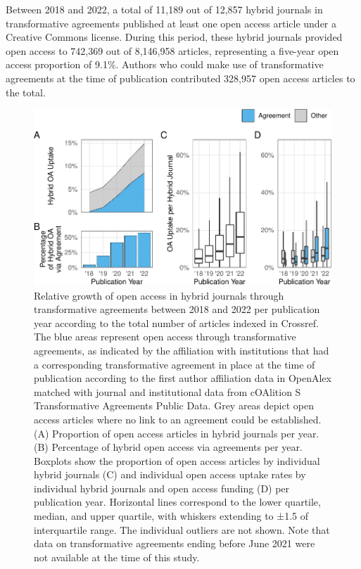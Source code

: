 \documentclass[a4paper,man,floatsintext,longtable,noextraspace,12pt]{apa6}
\begin{document}
Between 2018 and 2022, a total of 11,189 out of 12,857 hybrid journals
in transformative agreements published at least one open access article
under a Creative Commons license. During this period, these hybrid
journals provided open access to 742,369 out of 8,146,958 articles,
representing a five-year open access proportion of 9.1\%. Authors who
could make use of transformative agreements at the time of publication
contributed 328,957 open access articles to the total.

\begin{figure}

{\centering \includegraphics[width=0.99\linewidth]{fig/unnamed-chunk-2-1} 

}

\caption{Relative growth of open access in hybrid journals through transformative agreements between 2018 and 2022 per publication year  according to the total number of articles indexed in Crossref. The blue areas represent open access through transformative agreements, as indicated by the affiliation with institutions that had a corresponding transformative agreement in place at the time of publication according to the first author affiliation data in OpenAlex matched with journal and institutional data from cOAlition S Transformative Agreements Public Data. Grey areas depict open access articles where no link to an agreement could be established. (A) Proportion of open access articles in hybrid journals per year. (B) Percentage of hybrid open access via agreements per year. Boxplots show the proportion of open access articles by individual hybrid journals (C) and individual open access uptake rates by individual hybrid journals and open access funding (D) per publication year. Horizontal lines correspond to the lower quartile, median, and upper quartile, with whiskers extending to ±1.5 of interquartile range. The individual outliers are not shown. Note that data on transformative agreements ending before June 2021 were not available at the time of this study.}\label{fig:unnamed-chunk-2}
\end{figure}
\end{document}
